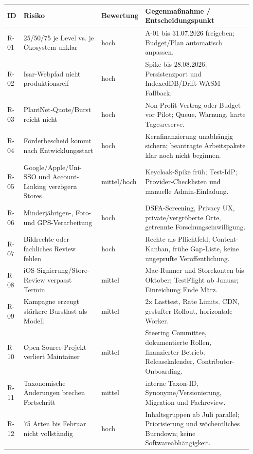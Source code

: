 \documentclass[10pt,a4paper,oneside]{article}
\begin{document}
\begin{longtable}{@{}p{13mm}p{41mm}p{20mm}p{83mm}@{}}
\toprule
\textbf{ID} & \textbf{Risiko} & \textbf{Bewertung} & \textbf{Gegenmaßnahme / Entscheidungspunkt} \\
\midrule
\endhead
R-01 & 25/50/75 je Level vs. je Ökosystem unklar & hoch & A-01 bis 31.07.2026 freigeben; Budget/Plan automatisch anpassen. \\
R-02 & Isar-Webpfad nicht produktionsreif & hoch & Spike bis 28.08.2026; Persistenzport und IndexedDB/Drift-WASM-Fallback. \\
R-03 & PlantNet-Quote/Burst reicht nicht & hoch & Non-Profit-Vertrag oder Budget vor Pilot; Queue, Warnung, harte Tagesreserve. \\
R-04 & Förderbescheid kommt nach Entwicklungsstart & hoch & Kernfinanzierung unabhängig sichern; beantragte Arbeitspakete klar noch nicht beginnen. \\
R-05 & Google/Apple/Uni-SSO und Account-Linking verzögern Stores & mittel/hoch & Keycloak-Spike früh; Test-IdP; Provider-Checklisten und manuelle Admin-Einladung. \\
R-06 & Minderjährigen-, Foto- und GPS-Verarbeitung & hoch & DSFA-Screening, Privacy UX, private/vergröberte Orte, getrennte Forschungseinwilligung. \\
R-07 & Bildrechte oder fachliches Review fehlen & hoch & Rechte als Pflichtfeld; Content-Kanban, frühe Gap-Liste, keine ungeprüfte Veröffentlichung. \\
R-08 & iOS-Signierung/Store-Review verpasst Termin & mittel & Mac-Runner und Storekonten bis Oktober; TestFlight ab Januar; Einreichung Ende März. \\
R-09 & Kampagne erzeugt stärkere Burstlast als Modell & mittel & 2x Lasttest, Rate Limits, CDN, gestufter Rollout, horizontale Worker. \\
R-10 & Open-Source-Projekt verliert Maintainer & mittel & Steering Committee, dokumentierte Rollen, finanzierter Betrieb, Releasekalender, Contributor-Onboarding. \\
R-11 & Taxonomische Änderungen brechen Fortschritt & mittel & interne Taxon-ID, Synonyme/Versionierung, Migration und Fachreview. \\
R-12 & 75 Arten bis Februar nicht vollständig & hoch & Inhaltsgruppen ab Juli parallel; Priorisierung und wöchentliches Burndown; keine Softwareabhängigkeit. \\
\bottomrule
\end{longtable}
\end{document}
